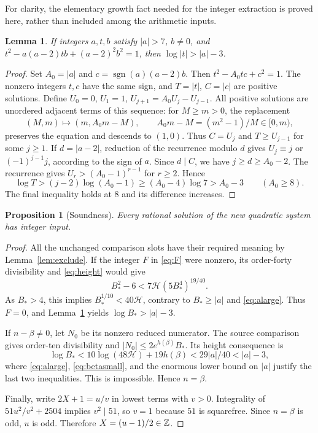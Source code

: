 \documentclass[11pt,a4paper]{article}
\newtheorem{lemma}[theorem]{Lemma}
\newtheorem{proposition}[theorem]{Proposition}
\theoremstyle{definition}\newtheorem{definition}[theorem]{Definition}
\theoremstyle{remark}\newtheorem{remark}[theorem]{Remark}
\newcommand{\HH}{\mathcal H}\newcommand{\ord}{\operatorname{ord}}
\begin{document}
For clarity, the elementary growth fact needed for the integer extraction
is proved here, rather than included among the arithmetic inputs.

\begin{lemma}\label{lem:lucas}
If integers $a,t,b$ satisfy $|a|>7$, $b\ne0$, and
$t^2-a(a-2)tb+(a-2)^2b^2=1$, then $\log|t|>|a|-3$.
\end{lemma}
\begin{proof}
Set $A_0=|a|$ and $c=\operatorname{sgn}(a)(a-2)b$. Then
$t^2-A_0tc+c^2=1$. The nonzero integers $t,c$ have the same sign,
and $T=|t|$, $C=|c|$ are positive solutions. Define
$U_0=0$, $U_1=1$, $U_{j+1}=A_0U_j-U_{j-1}$.
All positive solutions are unordered adjacent terms of this sequence:
for $M\ge m>0$, the replacement
\[
 (M,m)\longmapsto(m,A_0m-M),\qquad
 A_0m-M=(m^2-1)/M\in[0,m),
\]
preserves the equation and descends to $(1,0)$.
Thus $C=U_j$ and $T\ge U_{j-1}$ for some $j\ge1$.
If $d=|a-2|$, reduction of the recurrence modulo $d$ gives
$U_j\equiv j$ or $(-1)^{j-1}j$, according to the sign of $a$.
Since $d\mid C$, we have $j\ge d\ge A_0-2$.
The recurrence gives $U_r>(A_0-1)^{r-1}$ for $r\ge2$. Hence
\[
 \log T>(j-2)\log(A_0-1)
       \ge(A_0-4)\log7>A_0-3\qquad(A_0\ge8).
\]
The final inequality holds at $8$ and its difference increases.
\end{proof}

\begin{proposition}[Soundness]\label{prop:sound}
Every rational solution of the new quadratic system has integer input.
\end{proposition}
\begin{proof}
All the unchanged comparison slots have their required meaning by
Lemma~\ref{lem:exclude}. If the integer $F$ in \eqref{eq:F} were
nonzero, its order-forty divisibility and \eqref{eq:height} would give
\[
 B_*^2-6<7\HH(5B_*^4)^{19/40}.
\]
As $B_*>4$, this implies $B_*^{1/10}<40\HH$, contrary to
$B_*\ge|a|$ and \eqref{eq:alarge}. Thus $F=0$, and
Lemma~\ref{lem:lucas} yields $\log B_*>|a|-3$.

If $n-\beta\ne0$, let $N_0$ be its nonzero reduced numerator.
The source comparison gives order-ten divisibility and
$|N_0|\le2e^{h(\beta)}B_*$. Its height consequence is
\[
 \log B_*<10\log(48\HH)+19h(\beta)<29|a|/40<|a|-3,
\]
where \eqref{eq:alarge}, \eqref{eq:betasmall}, and the enormous lower
bound on $|a|$ justify the last two inequalities. This is impossible.
Hence $n=\beta$.

Finally, write $2X+1=u/v$ in lowest terms with $v>0$. Integrality of
$51u^2/v^2+2504$ implies $v^2\mid51$, so $v=1$ because $51$ is
squarefree. Since $n=\beta$ is odd, $u$ is odd. Therefore
$X=(u-1)/2\in\mathbb Z$.
\end{proof}
\end{document}
